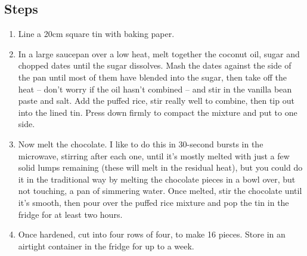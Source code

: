 \documentclass{book}
\begin{document}
\subsection*{Steps}
\begin{enumerate}
\item Line a 20cm square tin with baking paper.
\item In a large saucepan over a low heat, melt together the coconut oil, sugar and chopped dates until the sugar dissolves. Mash the dates against the side of the pan until most of them have blended into the sugar, then take off the heat – don’t worry if the oil hasn’t combined – and stir in the vanilla bean paste and salt. Add the puffed rice, stir really well to combine, then tip out into the lined tin. Press down firmly to compact the mixture and put to one side.
\item Now melt the chocolate. I like to do this in 30-second bursts in the microwave, stirring after each one, until it’s mostly melted with just a few solid lumps remaining (these will melt in the residual heat), but you could do it in the traditional way by melting the chocolate pieces in a bowl over, but not touching, a pan of simmering water. Once melted, stir the chocolate until it’s smooth, then pour over the puffed rice mixture and pop the tin in the fridge for at least two hours. 
\item Once hardened, cut into four rows of four, to make 16 pieces. Store in an airtight container in the fridge for up to a week.
\end{enumerate}
\newpage
\end{document}
